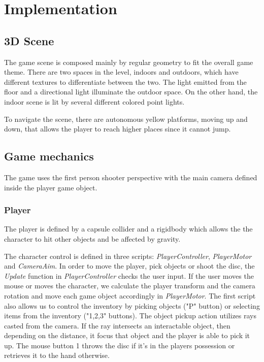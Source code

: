 \documentclass[a4paper]{article}
\begin{document}
\section{Implementation}

\subsection{3D Scene}
The game scene is composed mainly by regular geometry to fit the  overall game theme. There are two spaces in the level, indoors and outdoors, which have different textures to differentiate between the two. The light emitted from the floor and a directional light illuminate the outdoor space. On the other hand, the indoor scene is lit by several different colored point lights. 

To navigate the scene, there are autonomous yellow platforms, moving up and down, that allows the player to reach higher places since it cannot jump.

\subsection{Game mechanics}

	The game uses the first person shooter perspective with the main camera defined inside the player game object.
   
	\subsubsection{Player}
    The player is defined by a capsule collider and a rigidbody which allows the the character to hit other objects and be affected by gravity.
    
    
    
    The character control is defined in three scripts: \textit{PlayerController}, \textit{PlayerMotor} and \textit{CameraAim}. In order to move the player, pick objects or shoot the disc, the \textit{Update} function in \textit{PlayerController} checks the user input. If the user moves the mouse  or moves the character, we calculate the player transform and the camera rotation and move each game object accordingly in \textit{PlayerMotor}. The first script also allows us to control the inventory by picking objects ("P" button) or selecting items from the inventory ("1,2,3" buttons). The object pickup action utilizes rays casted from the camera. If the ray intersects an interactable object, then depending on the distance, it focus that object and the player is able to pick it up. The mouse button 1 throws the disc if it's in the players possession or retrieves it to the hand otherwise.
     
\end{document}
